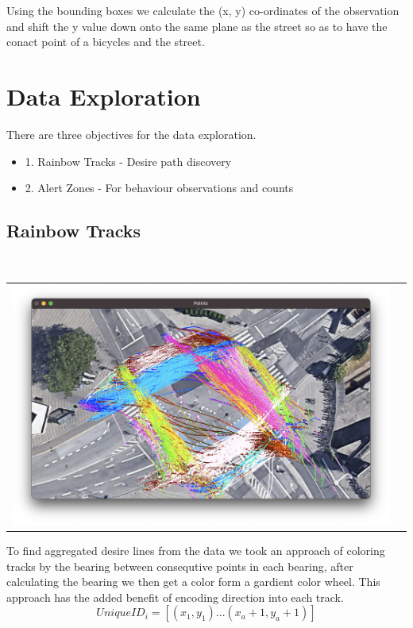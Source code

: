 \documentclass[
10pt, %
a4paper, %
oneside, %
headinclude,footinclude, %
] {book}%
\begin{document}
Using the bounding boxes we calculate the (x, y) co-ordinates of the observation and shift the y value down onto 
the same plane as the street so as to have the conact point of a bicycles and the street.

\section{Data Exploration}

There are three objectives for the data exploration.
\begin{itemize}
	\item1. Rainbow Tracks - Desire path discovery
	\item2. Alert Zones - For behaviour observations and counts
\end{itemize}

\subsection{Rainbow Tracks}

\ \\ 
\noindent
\begin{tabular}{@{}cc}
\includegraphics[width=1.0\columnwidth]{rainbow.png} 
\end{tabular}
\label{Rainbow}

To find aggregated desire lines from the data we took an approach of coloring tracks by the bearing between consequtive points in each 
bearing, after calculating the bearing we then get a color form a gardient color wheel. This approach has the added benefit of encoding direction into 
each track.
\ \\ 
\begin{equation}
  UniqueID_i = [(x_1, y_1)...(x_a+1, y_a+1)]\label{eq:3}
\end{equation}
\end{document}
